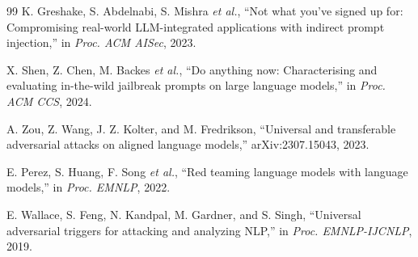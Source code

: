 \documentclass[conference]{IEEEtran}
\begin{document}
\begin{thebibliography}{99}
K. Greshake, S. Abdelnabi, S. Mishra \emph{et al.},
``Not what you've signed up for: Compromising real-world
LLM-integrated applications with indirect prompt injection,''
in \emph{Proc. ACM AISec}, 2023.

X. Shen, Z. Chen, M. Backes \emph{et al.},
``Do anything now: Characterising and evaluating in-the-wild
jailbreak prompts on large language models,''
in \emph{Proc. ACM CCS}, 2024.

A. Zou, Z. Wang, J. Z. Kolter, and M. Fredrikson,
``Universal and transferable adversarial attacks on aligned
language models,'' arXiv:2307.15043, 2023.

E. Perez, S. Huang, F. Song \emph{et al.},
``Red teaming language models with language models,''
in \emph{Proc. EMNLP}, 2022.

E. Wallace, S. Feng, N. Kandpal, M. Gardner, and S. Singh,
``Universal adversarial triggers for attacking and analyzing NLP,''
in \emph{Proc. EMNLP-IJCNLP}, 2019.

\end{thebibliography}
\end{document}
